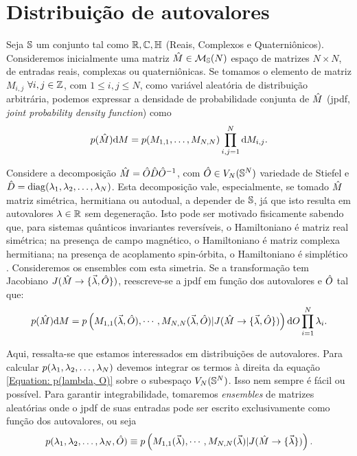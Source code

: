 \section{Distribuição de autovalores}

Seja $\mathbb{S}$ um conjunto tal como $\mathbb{R}, \mathbb{C}, \mathbb{H} $ (Reais, Complexos e Quaterniônicos). Consideremos inicialmente uma matriz $\hat M \in \mathcal{M}_{\mathbb{S}}(N)$ espaço de matrizes $N \times N$, de entradas reais, complexas ou quaterniônicas. Se tomamos o elemento de matriz $M_{i,j}$ $\forall i, j \in \mathbb{Z}$, com $1 \leq i, j \leq N$, como variável aleatória de distribuição arbitrária, podemos expressar a densidade de probabilidade conjunta de $\hat M$ (jpdf, \textit{joint probability density function}) como $$p(\hat{M}) \dd M = p(M_{1,1}, \dots, M_{N,N}) \prod_{i,j=1}^{N} \dd M_{i,j}.$$

Considere a decomposição $\hat M = \hat O \hat D \hat O^{-1}$, com $\hat O \in V_N(\mathbb{S}^N)$ variedade de Stiefel e $\hat D = \operatorname{diag}(\lambda_1, \lambda_2, \dots, \lambda_N)$. Esta decomposição vale, especialmente, se tomado $\hat M$ matriz simétrica, hermitiana ou autodual, a depender de $\mathbb{S}$, já que isto resulta em autovalores $\lambda \in \mathbb{R}$ sem degeneração. Isto pode ser motivado fisicamente sabendo que, para sistemas quânticos invariantes reversíveis, o Hamiltoniano é matriz real simétrica; na presença de campo magnético, o Hamiltoniano é matriz complexa hermitiana; na presença de acoplamento spin-órbita, o Hamiltoniano é simplético \cite[Capítulo~2]{RMT-firstcourse-Potters}. Consideremos os ensembles com esta simetria. Se a transformação tem Jacobiano $J(\hat M \rightarrow \{ \vec{\lambda}, \hat O \} )$, reescreve-se a jpdf em função dos autovalores e $\hat O$ tal que:
\begin{equation}
	 p(\hat{M}) \dd M = p \left( M_{1,1}(\vec{\lambda}, \hat O), \cdots, M_{N,N}(\vec{\lambda}, \hat O) | J(\hat M \rightarrow \{ \vec{\lambda}, \hat O \} ) \right) \dd O \prod_{i=1}^{N} \lambda_i.
\label{Equation: p(lambda, O)}
\end{equation}

Aqui, ressalta-se que estamos interessados em distribuições de autovalores. Para calcular $p(\lambda_1, \lambda_2, \dots, \lambda_N)$ devemos integrar os termos à direita da equação \ref{Equation: p(lambda, O)} sobre o subespaço $V_N(\mathbb{S}^N)$. Isso nem sempre é fácil ou possível. Para garantir integrabilidade, tomaremos \textit{ensembles} de matrizes aleatórias onde o jpdf de suas entradas pode ser escrito exclusivamente como função dos autovalores, ou seja $$p(\lambda_1, \lambda_2, \dots, \lambda_N, \hat O) \equiv p \left( M_{1,1}(\vec{\lambda}), \cdots, M_{N,N}(\vec{\lambda}) | J(\hat M \rightarrow \{ \vec{\lambda} \} ) \right).$$

